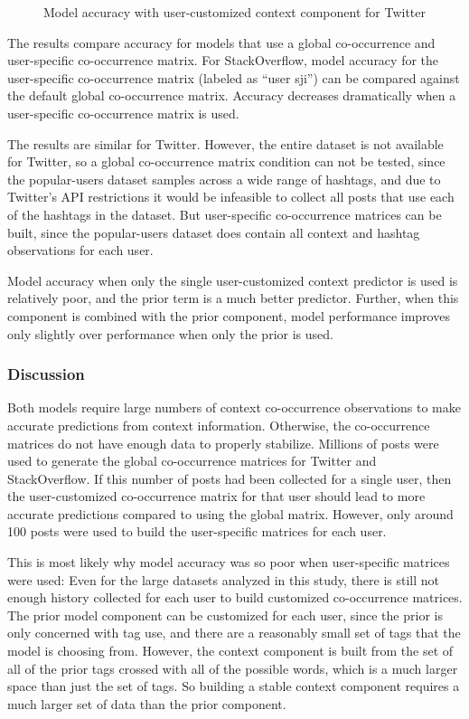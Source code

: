 \documentclass[man,floatsintext,donotrepeattitle]{apa6}
\begin{document}
\begin{figure}[!htbp]
  \caption{Model accuracy with user-customized context component for Twitter}
  \label{figPUCustomT}
\end{figure}

The results compare accuracy for models that use a global co-occurrence and user-specific co-occurrence matrix.
For StackOverflow, model accuracy for the user-specific co-occurrence matrix (labeled as ``user sji'') can be compared against the default global co-occurrence matrix.
Accuracy decreases dramatically when a user-specific co-occurrence matrix is used.

The results are similar for Twitter.
However, the entire dataset is not available for Twitter, so a global co-occurrence matrix condition can not be tested,
since the popular-users dataset samples across a wide range of hashtags, and due to Twitter's API restrictions it would be infeasible to collect all posts that use each of the hashtags in the dataset.
But user-specific co-occurrence matrices can be built, since the popular-users dataset does contain all context and hashtag observations for each user.

Model accuracy when only the single user-customized context predictor is used is relatively poor, and the prior term is a much better predictor.
Further, when this component is combined with the prior component, model performance improves only slightly over performance when only the prior is used.

\subsubsection{Discussion}

Both models require large numbers of context co-occurrence observations to make accurate predictions from context information.
Otherwise, the co-occurrence matrices do not have enough data to properly stabilize.
Millions of posts were used to generate the global co-occurrence matrices for Twitter and StackOverflow.
If this number of posts had been collected for a single user, then the user-customized co-occurrence matrix for that user should lead to more accurate predictions compared to using the global matrix.
However, only around 100 posts were used to build the user-specific matrices for each user.

This is most likely why model accuracy was so poor when user-specific matrices were used:
Even for the large datasets analyzed in this study, there is still not enough history collected for each user to build customized co-occurrence matrices.
The prior model component can be customized for each user, since the prior is only concerned with tag use, and there are a reasonably small set of tags that the model is choosing from.
However, the context component is built from the set of all of the prior tags crossed with all of the possible words, which is a much larger space than just the set of tags.
So building a stable context component requires a much larger set of data than the prior component.
\end{document}
